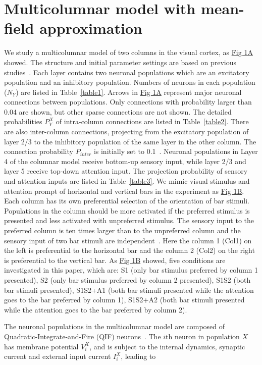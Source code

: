 \documentclass[10pt,letterpaper]{article}
\begin{document}
\section*{Multicolumnar model with mean-field approximation}
We study a multicolumnar model of two columns in the visual cortex, as \hyperlink{fig:fig1}{Fig 1A} showed. The structure and initial parameter settings are based on previous studies~\cite{wagatsuma2011}. Each layer contains two neuronal populations which are an excitatory population and an inhibitory population. Numbers of neurons in each population ($N_{Y}$) are listed in Table~\ref{table1}. Arrows in \hyperlink{fig:fig1}{Fig 1A} represent major neuronal connections between populations. Only connections with probability larger than 0.04 are shown, but other sparse connections are not shown. The detailed probabilities $P_{Y}^{X}$ of intra-column connections are listed in Table~\ref{table2}. There are also inter-column connections, projecting from the excitatory population of layer 2/3 to the inhibitory population of the same layer in the other column. The connection probability $P_{inter}$ is initially set to 0.1~\cite{wagatsuma2011}. Neuronal populations in Layer 4 of the columnar model receive bottom-up sensory input, while layer 2/3 and layer 5 receive top-down attention input. The projection probability of sensory and attention inputs are listed in Table~\ref{table3}. We mimic visual stimulus and attention prompt of horizontal and vertical bars in the experiment as \hyperlink{fig:fig1}{Fig 1B}. Each column has its own preferential selection of the orientation of bar stimuli. Populations in the column should be more activated if the preferred stimulus is presented and less activated with unpreferred stimulus. The sensory input to the preferred column is ten times larger than to the unpreferred column and the sensory input of two bar stimuli are independent~\cite{wagatsuma2011}. Here the column 1 (Col1) on the left is preferential to the horizontal bar and the column 2 (Col2) on the right is preferential to the vertical bar. As \hyperlink{fig:fig1}{Fig 1B} showed, five conditions are investigated in this paper, which are: S1 (only bar stimulus preferred by column 1 presented), S2 (only bar stimulus preferred by column 2 presented), S1S2 (both bar stimuli presented), S1S2+A1 (both bar stimuli presented while the attention goes to the bar preferred by column 1), S1S2+A2 (both bar stimuli presented while the attention goes to the bar preferred by column 2).

The neuronal populations in the multicolumnar model are composed of Quadratic-Integrate-and-Fire (QIF) neurons~\cite{kotani2014}. The $i$th neuron in population $X$ has membrane potential $V_{i}^{X}$, and is subject to the internal dynamics, synaptic current and external input current $I_{i}^{X}$, leading to 
\end{document}
